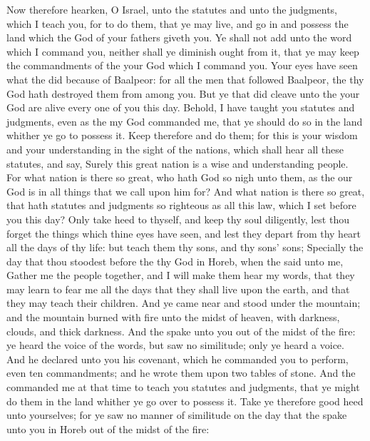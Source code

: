 \begin{biblechapter} %
 Now therefore hearken, O Israel, unto the statutes and unto the judgments, which I teach you, for to do them, that ye may live, and go in and possess the land which the \LORD God of your fathers giveth you.
\verse Ye shall not add unto the word which I command you, neither shall ye diminish ought from it, that ye may keep the commandments of the \LORD your God which I command you.
\verse Your eyes have seen what the \LORD did because of Baalpeor: for all the men that followed Baalpeor, the \LORD thy God hath destroyed them from among you.
\verse But ye that did cleave unto the \LORD your God are alive every one of you this day.
\verse Behold, I have taught you statutes and judgments, even as the \LORD my God commanded me, that ye should do so in the land whither ye go to possess it.
\verse Keep therefore and do them; for this is your wisdom and your understanding in the sight of the nations, which shall hear all these statutes, and say, Surely this great nation is a wise and understanding people.
\verse For what nation is there so great, who hath God so nigh unto them, as the \LORD our God is in all things that we call upon him for?
\verse And what nation is there so great, that hath statutes and judgments so righteous as all this law, which I set before you this day?
\verse Only take heed to thyself, and keep thy soul diligently, lest thou forget the things which thine eyes have seen, and lest they depart from thy heart all the days of thy life: but teach them thy sons, and thy sons' sons;
\verse Specially the day that thou stoodest before the \LORD thy God in Horeb, when the \LORD said unto me, Gather me the people together, and I will make them hear my words, that they may learn to fear me all the days that they shall live upon the earth, and that they may teach their children.
\verse And ye came near and stood under the mountain; and the mountain burned with fire unto the midst of heaven, with darkness, clouds, and thick darkness.
\verse And the \LORD spake unto you out of the midst of the fire: ye heard the voice of the words, but saw no similitude; only ye heard a voice.
\verse And he declared unto you his covenant, which he commanded you to perform, even ten commandments; and he wrote them upon two tables of stone.
\verse And the \LORD commanded me at that time to teach you statutes and judgments, that ye might do them in the land whither ye go over to possess it.
 Take ye therefore good heed unto yourselves; for ye saw no manner of similitude on the day that the \LORD spake unto you in Horeb out of the midst of the fire:

\end{biblechapter}

